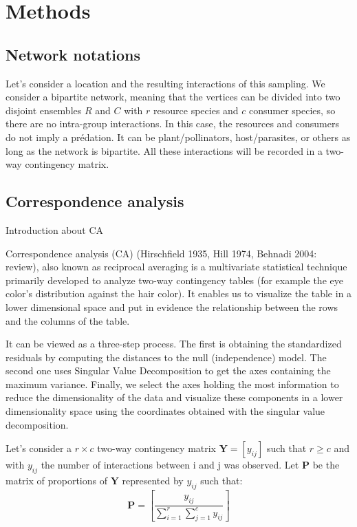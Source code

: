 \section{Methods}

\subsection{Network notations}
Let's consider a location and the resulting interactions of this sampling. We consider a bipartite network, meaning that the vertices can be divided into two disjoint ensembles $R$ and $C$ with $r$ resource species and $c$ consumer species, so there are no intra-group interactions. In this case, the resources and consumers do not imply a prédation. It can be plant/pollinators, host/parasites, or others as long as the network is bipartite.  All these interactions will be recorded in a two-way contingency matrix.


\citep{vadigepalli2003paint}


\subsection{Correspondence analysis}

Introduction about CA

Correspondence analysis (CA) (Hirschfield 1935, Hill 1974, Behnadi 2004: review), also known as reciprocal averaging is a multivariate statistical technique  primarily developed to analyze two-way contingency tables (for example the eye color's distribution against the hair color). It enables us to visualize the table in a lower dimensional space and put in evidence the relationship between the rows and the columns of the table.

It can be viewed as a three-step process. The first is obtaining the standardized residuals by computing the distances to the null (independence) model. The second one uses Singular Value Decomposition to get the axes containing the maximum variance. Finally, we select the axes holding the most information to reduce the dimensionality of the data and visualize these components in a lower dimensionality space using the coordinates obtained with the singular value decomposition.


Let's consider a $r \times c$ two-way contingency matrix $\mathbf{Y} = [y_{ij}]$ such that $r\geq c$ and with $y_{ij}$ the number of interactions between i and j was observed. Let $\mathbf{P}$ be the matrix of proportions of $\mathbf{Y}$ represented by $y_{ij}$ such that:
$$
\mathbf{P} = \left[ \frac{y_{ij}}{\sum_{i=1}^{r} \sum_{j=1}^{c} y_{ij}} \right]
$$

